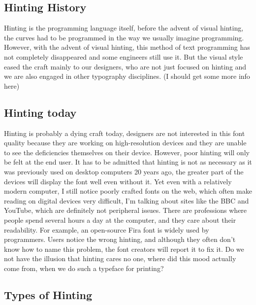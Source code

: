 \documentclass[a4paper]{article}
\begin{document}
\subsection{Hinting History}
Hinting is the programming language itself, before the advent of visual hinting, the curves had to be programmed in the way we usually imagine programming. However, with the advent of visual hinting, this method of text programming has not completely disappeared and some engineers still use it. But the visual style eased the craft mainly to our designers, who are not just focused on hinting and we are also engaged in other typography disciplines. (I should get some more info here)

\subsection{Hinting today}

Hinting is probably a dying craft today, designers are not interested in this font quality because they are working on high-resolution devices and they are unable to see the deficiencies themselves on their device. However, poor hinting will only be felt at the end user. It has to be admitted that hinting is not as necessary as it was previously used on desktop computers 20 years ago, the greater part of the devices will display the font well even without it. Yet even with a relatively modern computer, I still notice poorly crafted fonts on the web, which often make reading on digital devices very difficult, I'm talking about sites like the BBC and YouTube, which are definitely not peripheral issues. There are professions where people spend several hours a day at the computer, and they care about their readability. For example, an open-source Fira font is widely used by programmers. Users notice the wrong hinting, and although they often don't know how to name this problem, the font creators will report it to fix it. Do we not have the illusion that hinting cares no one, where did this mood actually come from, when we do such a typeface for printing?


\subsection{Types of Hinting}
\end{document}
